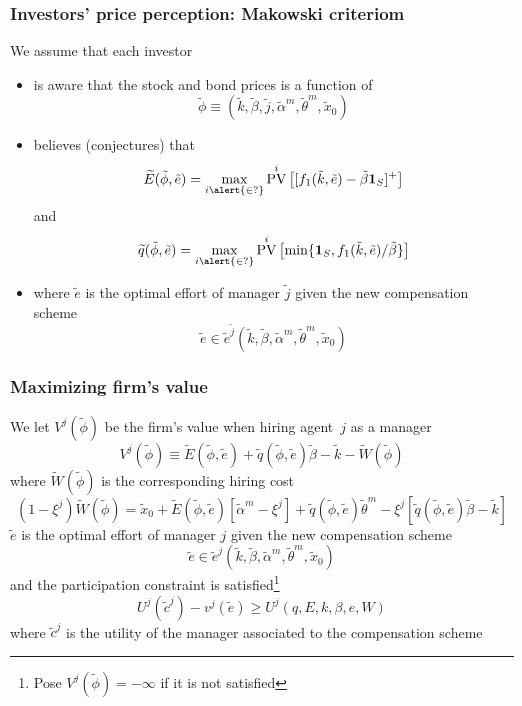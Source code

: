 \documentclass[blue]{beamer}
\DeclareMathOperator\PV{PV}
\def\E{\PV}
\def\1{\mathbf{1}}
\def\geq{\geqslant}
\theoremstyle{definition}
\theoremstyle{example}
\begin{document}

\begin{frame}\frametitle{Investors' price perception: Makowski criteriom}

We assume that each investor
    \begin{itemize}
    \item is aware that the stock and bond prices is a function of
    \[
    \tilde{\phi} \equiv (\tilde{k},\tilde{\beta},\tilde{j},\tilde{\alpha}^m,\tilde{\theta}^m,\tilde{x}_0)
    \]
    \item believes (conjectures) that
        \[
        \widetilde{E}(\tilde{\phi},\tilde{e}) = \max_{i \alert{\in ?}} \E^i \left[ [f_1(\tilde{k},\tilde{e})-\tilde{\beta} \1_S]^+ \right]
        \]
        and
        \[
        \widetilde{q}(\tilde{\phi},\tilde{e}) = \max_{i \alert{\in ?}} \E^i \left[ \min\{\1_S,f_1(\tilde{k},\tilde{e})/\tilde{\beta} \} \right]
        \]
    \item where $\tilde{e}$ is the optimal effort of manager $\tilde{j}$ given the new compensation scheme
     \[
 \tilde{e} \in \tilde{e}^{\tilde{j}} (\tilde{k},\tilde{\beta},\tilde{\alpha}^m,\tilde{\theta}^m,\tilde{x}_0)
 \]
    \end{itemize}

\end{frame}



\begin{frame}\frametitle{Maximizing firm's value}

We let $V^j(\tilde{\phi})$ be the firm's value when hiring agent~$j$ as a manager
\[
V^j(\tilde{\phi}) \equiv \tilde{E}(\tilde{\phi},\tilde{e}) + \tilde{q}(\tilde{\phi},\tilde{e}) \tilde{\beta} - \tilde{k} - \tilde{W}(\tilde{\phi})
\]
where $\tilde{W}(\tilde{\phi})$ is the corresponding hiring cost
\[
(1-\xi^j) \tilde{W}(\tilde{\phi}) = \tilde{x}_0 + \tilde{E}(\tilde{\phi},\tilde{e}) [\tilde{\alpha}^m-\xi^j] + \tilde{q}(\tilde{\phi},\tilde{e}) \tilde{\theta}^m - \xi^j[\tilde{q}(\tilde{\phi},\tilde{e}) \tilde{\beta} - \tilde{k}]
\]
$\tilde{e}$ is the optimal effort of manager $j$ given the new compensation scheme
     \[
 \tilde{e} \in \tilde{e}^j (\tilde{k},\tilde{\beta},\tilde{\alpha}^m,\tilde{\theta}^m,\tilde{x}_0)
 \]
and the participation constraint is satisfied\footnote{Pose $V^j(\tilde{\phi})=-\infty$ if it is not satisfied}
\[
U^j(\tilde{c}^j) - v^j(\tilde{e}) \geq U^j(q,E,k,\beta,e,W)
\]
where $\tilde{c}^j$ is the utility of the manager associated to the compensation scheme
\end{frame}
\end{document}
